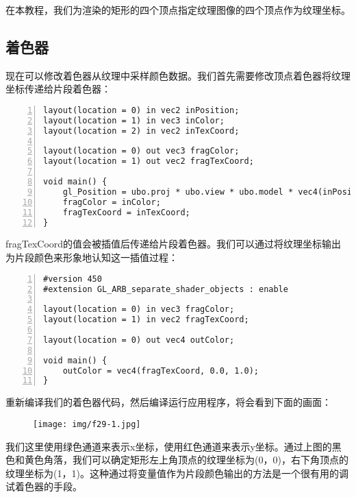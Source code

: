 \documentclass{ctexart}
\begin{document}
在本教程，我们为渲染的矩形的四个顶点指定纹理图像的四个顶点作为纹理坐标。

\subsection{着色器}

现在可以修改着色器从纹理中采样颜色数据。我们首先需要修改顶点着色器将纹理坐标传递给片段着色器：

\begin{lstlisting}[language={[ANSI]C},keywordstyle=\color{blue!70},commentstyle=\color{red!50!green!50!blue!50},frame=shadowbox, rulesepcolor=\color{red!20!green!20!blue!20},basicstyle=\small,numbers=left, numberstyle=\tiny,breaklines=true]
layout(location = 0) in vec2 inPosition;
layout(location = 1) in vec3 inColor;
layout(location = 2) in vec2 inTexCoord;

layout(location = 0) out vec3 fragColor;
layout(location = 1) out vec2 fragTexCoord;

void main() {
	gl_Position = ubo.proj * ubo.view * ubo.model * vec4(inPosition, 0.0, 1.0);
	fragColor = inColor;
	fragTexCoord = inTexCoord;
}
\end{lstlisting}

fragTexCoord的值会被插值后传递给片段着色器。我们可以通过将纹理坐标输出为片段颜色来形象地认知这一插值过程：

\begin{lstlisting}[language={[ANSI]C},keywordstyle=\color{blue!70},commentstyle=\color{red!50!green!50!blue!50},frame=shadowbox, rulesepcolor=\color{red!20!green!20!blue!20},basicstyle=\small,numbers=left, numberstyle=\tiny,breaklines=true]
#version 450
#extension GL_ARB_separate_shader_objects : enable

layout(location = 0) in vec3 fragColor;
layout(location = 1) in vec2 fragTexCoord;

layout(location = 0) out vec4 outColor;

void main() {
	outColor = vec4(fragTexCoord, 0.0, 1.0);
}
\end{lstlisting}

重新编译我们的着色器代码，然后编译运行应用程序，将会看到下面的画面：

\begin{figure}[H]
	\centering
	\texttt{[image: img/f29-1.jpg]}
\end{figure}

我们这里使用绿色通道来表示x坐标，使用红色通道来表示y坐标。通过上图的黑色和黄色角落，我们可以确定矩形左上角顶点的纹理坐标为(0，0)，右下角顶点的纹理坐标为(1，1)。这种通过将变量值作为片段颜色输出的方法是一个很有用的调试着色器的手段。
\end{document}
